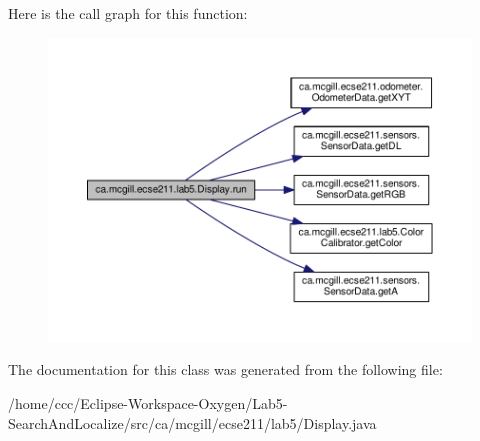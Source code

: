 Here is the call graph for this function\+:
\nopagebreak
\begin{figure}[H]
\begin{center}
\leavevmode
\includegraphics[width=350pt]{classca_1_1mcgill_1_1ecse211_1_1lab5_1_1_display_a047e885f7170ba80f60fd3b4b2bc79a9_cgraph}
\end{center}
\end{figure}


The documentation for this class was generated from the following file\+:\begin{DoxyCompactItemize}
\item 
/home/ccc/\+Eclipse-\/\+Workspace-\/\+Oxygen/\+Lab5-\/\+Search\+And\+Localize/src/ca/mcgill/ecse211/lab5/Display.\+java\end{DoxyCompactItemize}
